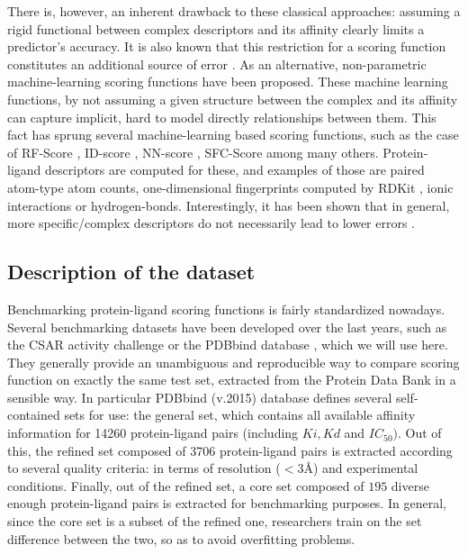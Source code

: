 \documentclass[10pt,a4paper,twoside]{book}
\begin{document}
There is, however, an inherent drawback to these classical approaches: assuming a rigid functional between complex descriptors and its affinity clearly limits a predictor's accuracy. It is also known that this restriction for a scoring function constitutes an additional source of error \cite{Baum2010}. As an alternative, non-parametric machine-learning scoring functions have been proposed. These machine learning functions, by not assuming a given structure between the complex and its affinity can capture implicit, hard to model directly relationships between them. This fact has sprung several machine-learning based scoring functions, such as the case of RF-Score \cite{Ballester2010}, ID-score \cite{Li2013}, NN-score \cite{Durrant2011}, SFC-Score \cite{Zilian2013} among many others. Protein-ligand descriptors are computed for these, and examples of those are paired atom-type atom counts, one-dimensional fingerprints computed by RDKit \cite{Labute2000}, ionic interactions or hydrogen-bonds. Interestingly, it has been shown that in general, more specific/complex descriptors do not necessarily lead to lower errors \cite{Ballester2014}.

\subsection{Description of the dataset}

Benchmarking protein-ligand scoring functions is fairly standardized nowadays. Several benchmarking datasets have been developed over the last years, such as the CSAR activity challenge \cite{Dunbar2013} or the PDBbind database \cite{Wang2004}, which we will use here. They generally provide an unambiguous and reproducible way to compare scoring function on exactly the same test set, extracted from the Protein Data Bank in a sensible way. In particular PDBbind (v.2015) database defines several self-contained sets for use: the general set, which contains all available affinity information for 14260 protein-ligand pairs (including $Ki, Kd$ and $IC_{50})$. Out of this, the refined set composed of 3706  protein-ligand pairs is extracted according to several quality criteria: in terms of resolution ($<3$\AA) and experimental conditions. Finally, out of the refined set, a core set composed of $195$ diverse enough protein-ligand pairs is extracted for benchmarking purposes. In general, since the core set is a subset of the refined one, researchers train on the set difference between the two, so as to avoid overfitting problems.\\
\end{document}
